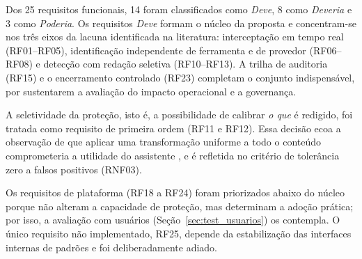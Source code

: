 Dos 25 requisitos funcionais, 14 foram classificados como \textit{Deve}, 8 como \textit{Deveria} e 3 como \textit{Poderia}. Os requisitos \textit{Deve} formam o núcleo da proposta e concentram-se nos três eixos da lacuna identificada na literatura: interceptação em tempo real (RF01--RF05), identificação independente de ferramenta e de provedor (RF06--RF08) e detecção com redação seletiva (RF10--RF13). A trilha de auditoria (RF15) e o encerramento controlado (RF23) completam o conjunto indispensável, por sustentarem a avaliação do impacto operacional e a governança.

A seletividade da proteção, isto é, a possibilidade de calibrar \textit{o que} é redigido, foi tratada como requisito de primeira ordem (RF11 e RF12). Essa decisão ecoa a observação de que aplicar uma transformação uniforme a todo o conteúdo comprometeria a utilidade do assistente \cite{pan2025selective}, e é refletida no critério de tolerância zero a falsos positivos (RNF03).

Os requisitos de plataforma (RF18 a RF24) foram priorizados abaixo do núcleo porque não alteram a capacidade de proteção, mas determinam a adoção prática; por isso, a avaliação com usuários (Seção~\ref{sec:test_usuarios}) os contempla. O único requisito não implementado, RF25, depende da estabilização das interfaces internas de padrões e foi deliberadamente adiado.
